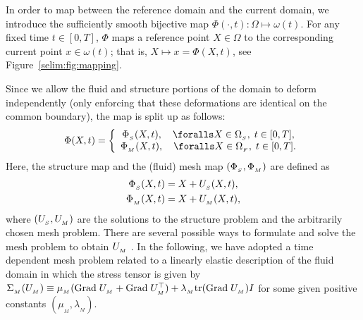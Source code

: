 In order to map between the reference domain and the current domain,
we introduce the sufficiently smooth bijective map $\Phi(\cdot,
t):\Omega\mapsto \omega(t)$.  For any fixed time $t\in[0,T]$, $\Phi$
maps a reference point $X\in\Omega$ to the corresponding current point
$x\in\omega(t)$; that is, $X \mapsto x = \Phi(X,t)$, see
Figure~\ref{selim:fig:mapping}.

Since we allow the fluid and structure portions of the domain to
deform independently (only enforcing that these deformations are
identical on the common boundary), the map is split up as follows:\vspace*{2pt}
\begin{equation}
\label{selim:eq:ALEmapI}
\Phi(X,t) =
\left\{
\begin{array}{ccc}
\PhiS(X, t), \quad \foralls X\in\OS,\; t\in[0,T],\\
\PhiM(X, t), \quad \foralls X\in\OF,\; t\in[0,T].
\end{array}
\right.
\end{equation}
Here, the structure map and the (fluid) mesh map $(\Phi_{_{S}}, \Phi_{_{M}})$ are
defined as
\begin{align}
\label{selim:eq:ALEmapII}
\Phi_{_{S}}(X, t) &= X + U_{_{S}}(X,t),\\
\Phi_{_{M}}(X, t) &= X + U_{_{M}}(X,t),
\end{align}
where $(U_{_{S}}, U_{_{M}})$ are the solutions to the structure problem and the
arbitrarily chosen mesh problem.  There are several
possible ways to formulate and solve the mesh problem to obtain
$U_{_{M}}$ \citep{HermanssonHansbo2003, LopezNigroStorti2008}.  In the
following, we have adopted a time dependent mesh problem related to a
linearly elastic description of the fluid domain in which the stress
tensor is given by $\Sigma_{_{M}}(U_{_{M}})\equiv \mu_{{_M}}(\textrm{Grad}\;U_{_{M}} +
\textrm{Grad}\;U_{_{M}}^{\top})+ \lambda_{_{M}}\textrm{tr}(\textrm{Grad}\;U_{_{M}})I$ for some given
positive constants $(\mu_{{_M}},\lambda_{_{M}})$.

